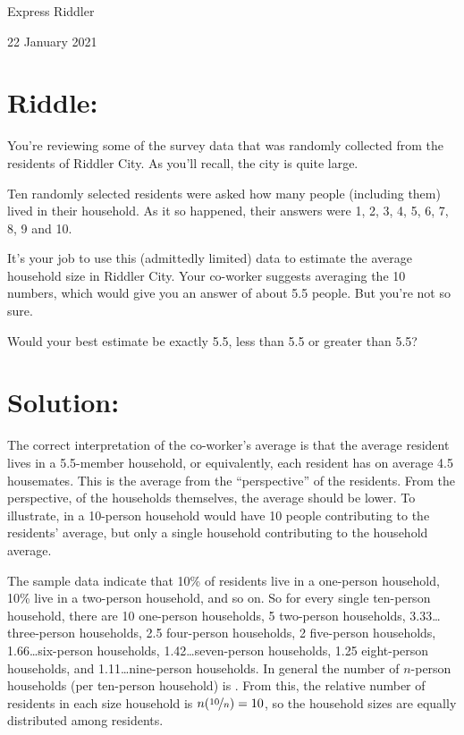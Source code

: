 \documentclass{article}
\begin{document}
\pagestyle{empty} %

\begin{center}
{\LARGE Express Riddler}

\vspace{0.15in}

{\Large 22 January 2021}
\end{center}


\section*{Riddle:}

You're reviewing some of the survey data that was randomly collected from the residents of Riddler City.
As you'll recall, the city is quite large.

Ten randomly selected residents were asked how many people (including them) lived in their household.
As it so happened, their answers were 1, 2, 3, 4, 5, 6, 7, 8, 9 and 10.

It's your job to use this (admittedly limited) data to estimate the average household size in Riddler City.
Your co-worker suggests averaging the 10 numbers, which would give you an answer of about 5.5 people.
But you're not so sure.

Would your best estimate be exactly 5.5, less than 5.5 or greater than 5.5?


\section*{Solution:}

The correct interpretation of the co-worker's average is that the average resident lives in a 5.5-member household, or equivalently, each resident has on average 4.5 housemates.
This is the average from the ``perspective'' of the residents.
From the perspective, of the households themselves, the average should be lower.
To illustrate, in a 10-person household would have 10 people contributing to the residents' average, but only a single household contributing to the household average.

The sample data indicate that 10\% of residents live in a one-person household, 10\% live in a two-person household, and so on.
So for every single ten-person household, there are 10 one-person households, 5 two-person households, 3.33\dots three-person households, 2.5 four-person households, 2 five-person households, 1.66\dots six-person households, 1.42\dots seven-person households, 1.25 eight-person households, and 1.11\dots nine-person households.
In general the number of $n$-person households (per ten-person household) is .
From this, the relative number of residents in each size household is $n(\nicefrac{10}{n})=10$, so the household sizes are equally distributed among residents.
\end{document}
